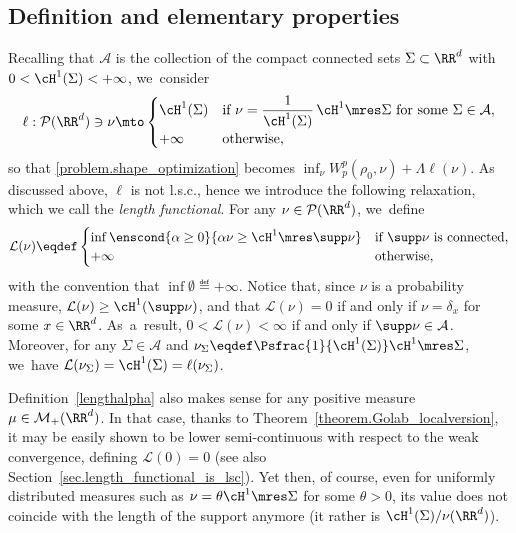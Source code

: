 \subsection{Definition and elementary properties}\label{subsec.deflength}
Recalling that $\mathcal{A}$ is the collection of the compact connected sets $\Sigma \subset \RR^d$ with $0<\cH^1(\Sigma)<+\infty$, we~consider
\begin{equation}\label{eq:defl}
\ell : \mathcal{P}(\RR^d) \ni \nu \mto
\begin{cases}
\cH^1(\Sigma) & \text{if $\nu=\dfrac{1}{\cH^1(\Sigma)}\,\cH^1\mres \Sigma$ for some $\Sigma \in \mathcal{A}$},\\
+\infty& \text{otherwise,}
\end{cases}
\end{equation}
so that \eqref{problem.shape_optimization} becomes $\inf_\nu W_p^p(\rho_0, \nu) + \Lambda\ell(\nu)$. As discussed above, $\ell$ is not l.s.c., hence we introduce the following relaxation, which we call the \emph{length functional}. For any $\nu \in \mathcal{P}(\RR^d)$, we~define
\begin{equation}
\mathcal{L}(\nu)
\eqdef
\begin{cases}
\inf \enscond{\alpha \ge 0}{\alpha \nu \ge \cH^1\mres \supp \nu} & \mbox{if $\supp \nu$ is connected,}\\
+\infty & \mbox{otherwise,}
\end{cases}\label{lengthalpha}
\end{equation}
with the convention that $\inf \emptyset \eqdef +\infty$. Notice that, since $\nu$ is a probability measure, $\mathcal{L}(\nu)\geq \cH^1(\supp \nu)$, and that $\mathcal{L}(\nu)=0$ if and only if $\nu = \delta_x$ for some $x \in \RR^d$. As~a~result, $0<\mathcal{L}(\nu) < \infty$ if and only if $\supp \nu \in \mathcal{A}$. Moreover, for any $\Sigma \in \mathcal{A}$ and $ \nu_\Sigma\eqdef\Psfrac{1}{\cH^1(\Sigma)} \cH^1\mres \Sigma$, we~have $\mathcal{L}(\nu_\Sigma) = \cH^1(\Sigma)=\ell(\nu_\Sigma)$.

\begin{remark}
Definition~\eqref{lengthalpha} also makes sense for any positive measure $\mu \in \mathcal{M}_+(\RR^d)$. In that case, thanks to Theorem~\ref{theorem.Golab_localversion}, it may be easily shown to be
lower semi-continuous with respect to the weak convergence,
defining $\mathcal{L}(0)=0$ (see also Section~\ref{sec.length_functional_is_lsc}).
Yet then, of course, even for uniformly distributed measures such as $\nu = \theta\cH^1\mres \Sigma$ for some $\theta> 0$, its value does not coincide with the length of the support anymore (it rather is $\cH^1(\Sigma)/\nu(\RR^d)$).
\end{remark}

